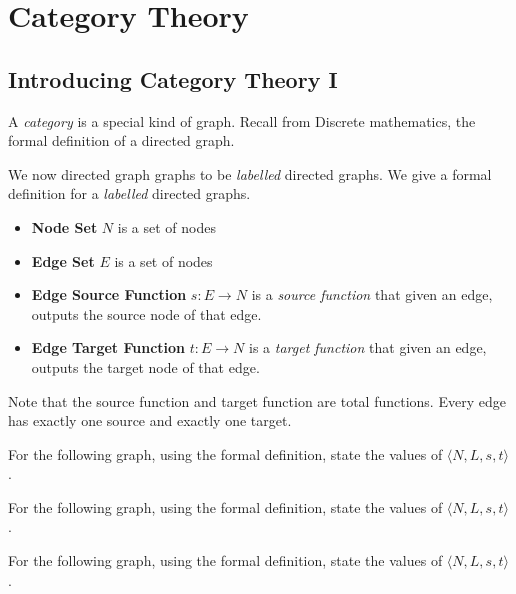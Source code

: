 
\chapter{Category Theory}


\section{Introducing Category Theory I}

A \textit{category} is a special kind of graph. Recall from Discrete mathematics, 
the formal definition of a directed graph. 


We now directed graph graphs to be \textit{labelled} directed graphs. 
We give a formal definition for a \textit{labelled} directed graphs. 


\begin{itemize}   
\renewcommand{\labelitemi}{$\Box$}
\item \textbf{Node Set} $N$ is a set of nodes
\item \textbf{Edge Set} $E$ is a set of nodes 
\item \textbf{Edge Source Function} $s:E \rightarrow N$ is a \textit{source function} 
that given an edge, outputs the source node of that edge.
\item \textbf{Edge Target Function} $t:E \rightarrow N$ is a \textit{target function}
that given an edge, outputs the target node of that edge.
\end{itemize}

Note that the source function and target function are total functions. 
Every edge has exactly one source and exactly one target. 

\begin{example}
For the following graph, using the formal definition, 
state the values of $\langle N, L, s, t \rangle$. 




\end{example}

\begin{example}
For the following graph, using the formal definition, 
state the values of $\langle N, L, s, t \rangle$. 
\end{example}

\begin{example}
For the following graph, using the formal definition, 
state the values of $\langle N, L, s, t \rangle$. 
\end{example}

